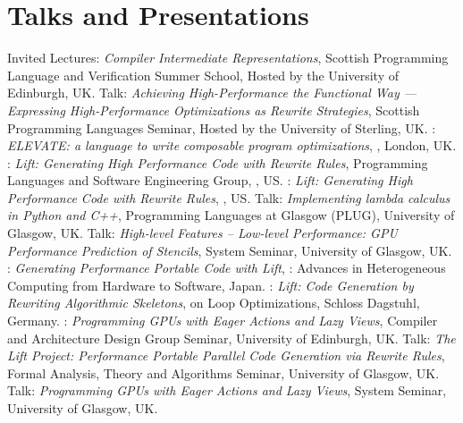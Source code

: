 \section{Talks and Presentations}
  {Invited Lectures: \emph{Compiler Intermediate Representations},
  \small Scottish Programming Language and Verification Summer School,
  Hosted by the University of Edinburgh, UK.}
  {Talk: \emph{Achieving High-Performance the Functional Way — Expressing High-Performance Optimizations as Rewrite Strategies},
  \small Scottish Programming Languages Seminar,
  Hosted by the University of Sterling, UK.}
  {: \emph{ ELEVATE: a language to write composable program optimizations},
  \small {}, London, UK.}
  {: \emph{Lift: Generating High Performance Code with Rewrite Rules},
  \small Programming Languages and Software Engineering Group, , US.}
  {: \emph{Lift: Generating High Performance Code with Rewrite Rules},
    \small {}, US.}
         {Talk: \emph{Implementing lambda calculus in Python and C++},
          \small Programming Languages at Glasgow (PLUG), University of Glasgow, UK.}
         {Talk: \emph{High-level Features – Low-level Performance: GPU Performance Prediction of Stencils},
          \small System Seminar, University of Glasgow, UK.}
         {:
          \emph{Generating Performance Portable Code with Lift},
         \small {}: Advances in Heterogeneous Computing from Hardware to Software, Japan.}
         {:
          \emph{Lift: Code Generation by Rewriting Algorithmic Skeletons},
         \small {} on Loop Optimizations, Schloss Dagstuhl, Germany.}
         {:
          \emph{Programming GPUs with Eager Actions and Lazy Views},
         \small Compiler and Architecture Design Group Seminar, University of Edinburgh, UK.}
         {Talk: \emph{The Lift Project: Performance Portable Parallel Code Generation via Rewrite Rules},
         \small Formal Analysis, Theory and Algorithms Seminar, University of Glasgow, UK.}
         {Talk: \emph{Programming GPUs with Eager Actions and Lazy Views},
         \small System Seminar, University of Glasgow, UK.}
